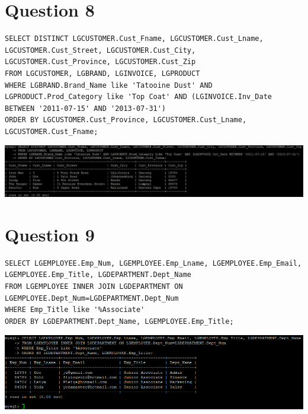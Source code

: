 \documentclass[a4paper,10pt]{article}
\begin{document}
\section*{Question 8}
\lstset{
            language=SQL,
            breaklines=true
            }
        \begin{lstlisting}[frame=single]
        SELECT DISTINCT LGCUSTOMER.Cust_Fname, LGCUSTOMER.Cust_Lname, LGCUSTOMER.Cust_Street, LGCUSTOMER.Cust_City, LGCUSTOMER.Cust_Province, LGCUSTOMER.Cust_Zip
FROM LGCUSTOMER, LGBRAND, LGINVOICE, LGPRODUCT
WHERE LGBRAND.Brand_Name like 'Tatooine Dust' AND LGPRODUCT.Prod_Category like 'Top Coat' AND (LGINVOICE.Inv_Date BETWEEN '2011-07-15' AND '2013-07-31')
ORDER BY LGCUSTOMER.Cust_Province, LGCUSTOMER.Cust_Lname, LGCUSTOMER.Cust_Fname;

        \end{lstlisting}
\includegraphics{Queries/Question_8/Q8_screenshot.jpg}
\section*{Question 9}
\lstset{
            language=SQL,
            breaklines=true
            }
        \begin{lstlisting}[frame=single]
        SELECT LGEMPLOYEE.Emp_Num, LGEMPLOYEE.Emp_Lname, LGEMPLOYEE.Emp_Email, LGEMPLOYEE.Emp_Title, LGDEPARTMENT.Dept_Name
FROM LGEMPLOYEE INNER JOIN LGDEPARTMENT ON LGEMPLOYEE.Dept_Num=LGDEPARTMENT.Dept_Num
WHERE Emp_Title like '%Associate'
ORDER BY LGDEPARTMENT.Dept_Name, LGEMPLOYEE.Emp_Title;

        \end{lstlisting}
\includegraphics{Queries/Question_9/Question_9_screenshot.PNG}
\end{document}
